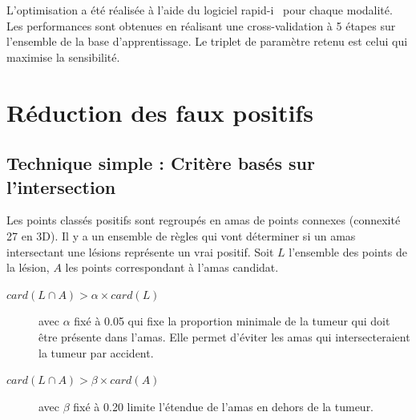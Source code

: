L'optimisation a été réalisée à l'aide du logiciel rapid-i~\cite{mierswa2006} pour chaque modalité. Les performances sont obtenues en réalisant une cross-validation à 5 étapes sur l'ensemble de la base d'apprentissage. Le triplet de paramètre retenu est celui qui maximise la sensibilité.
% 
% 

\section{Réduction des faux positifs}

\subsection{Technique simple : Critère basés sur l'intersection}

Les points classés positifs sont regroupés en amas de points connexes (connexité 27 en 3D). Il y a un ensemble de règles qui vont déterminer si un amas intersectant une lésions représente un vrai positif. Soit $L$ l'ensemble des points de la lésion, $A$ les points correspondant à l'amas candidat.

\begin{description}
 \item[$card( L \cap A ) > \alpha \times card( L )$] avec $\alpha$ fixé à 0.05 qui fixe la proportion minimale de la tumeur qui doit être présente dans l'amas. Elle permet d'éviter les amas qui intersecteraient la tumeur par accident.
 \item[$card( L \cap A ) > \beta \times card( A )$]  avec $\beta$ fixé à 0.20 limite l'étendue de l'amas en dehors de la tumeur.
\end{description}

